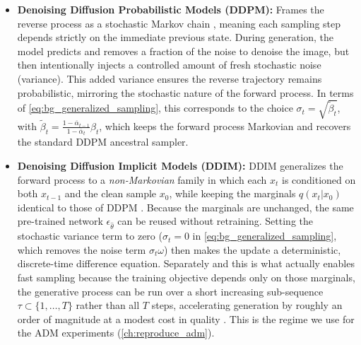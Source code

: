 \begin{itemize}
    \item \textbf{Denoising Diffusion Probabilistic Models (\acs{DDPM}):} 
    Frames the reverse process as a stochastic Markov chain \cite{ho_denoising_2020}, meaning each sampling step depends strictly on the immediate previous state. During generation, the model predicts and removes a fraction of the noise to denoise the image, but then intentionally injects a controlled amount of fresh stochastic noise (variance). This added variance ensures the reverse trajectory remains probabilistic, mirroring the stochastic nature of the forward process. In terms of \autoref{eq:bg_generalized_sampling}, this corresponds to the choice $\sigma_t = \sqrt{\tilde{\beta}_t}$, with $\tilde{\beta}_t = \tfrac{1-\overline{\alpha}_{t-1}}{1-\overline{\alpha}_t}\beta_t$, which keeps the forward process Markovian and recovers the standard \acs{DDPM} ancestral sampler.
    
    \item \textbf{Denoising Diffusion Implicit Models (\acs{DDIM}):} 
    \acs{DDIM} generalizes the forward process to a \emph{non-Markovian} family in which each $x_t$ is conditioned on both $x_{t-1}$ and the clean sample $x_0$, while keeping the marginals $q(x_t|x_0)$ identical to those of \acs{DDPM} \cite{song_denoising_2022}. Because the marginals are unchanged, the same pre-trained network $\epsilon_{\hat{\theta}}$ can be reused without retraining. Setting the stochastic variance term to zero ($\sigma_t = 0$ in \autoref{eq:bg_generalized_sampling}, which removes the noise term $\sigma_t \omega$) then makes the update a deterministic, discrete-time difference equation. Separately and this is what actually enables fast sampling because the training objective depends only on those marginals, the generative process can be run over a short increasing sub-sequence $\tau \subset \{1, \dots, T\}$ rather than all $T$ steps, accelerating generation by roughly an order of magnitude at a modest cost in quality \parencite{song_denoising_2022}. This is the regime we use for the \acs{ADM} experiments (\autoref{ch:reproduce_adm}).
\end{itemize}

